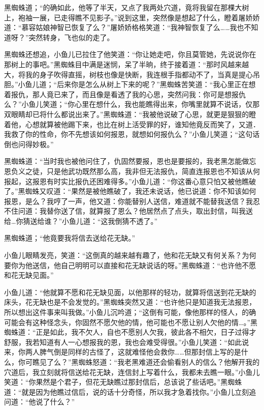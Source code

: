 \documentclass[12pt,oneside]{book}
\begin{document}
黑蜘蛛道；``的确如此，他等了半天，又点了我两处穴道，竟将我留在那棵大树上，袍袖一展，已走得瞧不见影子。''说到这里，突然像是想起了什么，瞪着屠娇娇道：``慕容姑娘神智已恢复了么？''屠娇娇格格笑道：``我神智恢复了么\ldots\ldots 我也不知道呀？''突然转身，飞也似的走了。

黑蜘蛛还想追，小鱼儿已拉住了他笑道：``你让她走吧，你且莫管她，先说说你在那树上的事吧。''黑蜘蛛目中满是迷悯，呆了半晌，终于接着道：``那时风越来越大，将我的身子吹得直摇，树枝也像是快断，我连根手指都动不了，当真是提心吊胆。''小鱼儿道；``后来你是怎么从树上下来的呢？''黑蜘蛛苦笑道：``我心里正在想着报仇，那人竟已来了，而且像是看透了我的心思，突然问我：你可是想报仇么？''小鱼儿笑道；``你心里在想什么，我也能瞧得出来，你嘴里就算不说话，仅那双眼睛却已将什么都说出来了。''黑蜘蛛道：``我被他说破了心思，就更是狠狠的瞪着他，心想就算被他踢下来，也比在树上活受罪的好，谁知他竟反而笑了，又道．我救了你的性命，你不先想该如何报恩，就想如何报仇么？''小鱼儿笑道；``这句话倒也问得妙极。''

黑蜘蛛道：``当时我也被他问住了，仇固然要报，恩也是要报的，我老黑怎能做忘恩负义之徒，只是他武功既然那么高，我非但无法报仇，简直连报恩也不知该从何报起，这报恩有时实比报仇还困难得多。''小鱼儿道：``你这番心意只怕又被他瞧破了。''黑蜘蛛又叹道：``果然是被他瞧破了，我还未说话，他已说道：你不知该如何报恩，是么？我哼了一声，他又道：你能替别人送信，难道就不能替我送信？我忍不住问道：我替你送了信，就算报了恩么？他居然点了点头，取出封信，叫我送给\ldots 你猜送给谁？''小鱼儿道：``这我倒猜不透了。''

黑蜘蛛道；``他竟要我将信去送给花无缺。''

小鱼儿眼睛发亮，笑道：``这倒真的越来越有趣了，他和花无缺又有何关系？为何要你为他送信，他自己明明可以直接和花无缺说话的呀。''黑蜘蛛道：``也许他不愿和花无缺见面。''

小鱼儿道：``他就算不愿和花无缺见面，以他那样的轻功，就算将信送到花无缺的床头，花无缺也是不会发觉的。''黑蜘蛛突然又道：``也许他只是知道我无法报恩，所以想出这件事来叫我做。''小鱼儿沉吟道；``这倒有可能，像他那样的怪人，的确可能会有这种怪念头，你固然不愿欠他的情，他可能也不愿让别人欠他的情\ldots。''黑蜘蛛道：``正是如此，我不欠人，自也不愿别人欠我，彼此各不相欠，日子过得才舒服，我若知道有人一心想报我的恩，我也会难受得很。''小鱼儿笑道：``如此说来，你两人脾气倒是同样的古怪了，这就难怪他会救你\ldots\ldots 但那封信上写的是什么，你可瞧见了么？''黑蜘蛛怒道：``我老黑难道还会偷看别人的信么？他解开我的穴道后，我立刻就将信送给花无缺，连信封上写着什么，我都未去瞧一眼。''小鱼儿笑道：``你果然是个君子，但花无缺瞧过那封信后，总该说了些话吧。''黑蜘蛛道：``就是因为他瞧过信后，说的话十分奇怪，所以我才急着找你。''小鱼儿立刻追问道：``他说了什么？''
\end{document}
